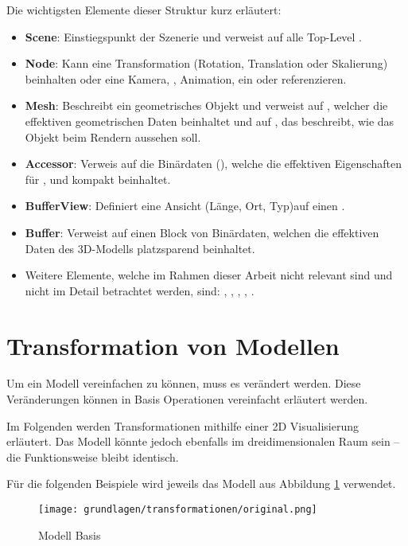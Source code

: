 Die wichtigsten Elemente dieser Struktur kurz erläutert:
\begin{itemize}
  \item \textbf{Scene}: Einstiegspunkt der Szenerie und verweist auf alle Top-Level .
  \item \textbf{Node}: Kann eine Transformation (Rotation, Translation oder Skalierung) beinhalten oder eine Kamera, , Animation, ein  oder  referenzieren.
  \item  \textbf{Mesh}: Beschreibt ein geometrisches Objekt und verweist auf , welcher die effektiven geometrischen Daten beinhaltet und auf , das beschreibt, wie das Objekt beim Rendern aussehen soll.
  \item \textbf{Accessor}: Verweis auf die Binärdaten (), welche die effektiven Eigenschaften für ,  und  kompakt beinhaltet.
  \item \textbf{BufferView}: Definiert eine Ansicht (Länge, Ort, Typ)auf einen .
  \item \textbf{Buffer}: Verweist auf einen Block von Binärdaten, welchen die effektiven Daten des 3D-Modells platzsparend beinhaltet.
  \item Weitere Elemente, welche im Rahmen dieser Arbeit nicht relevant sind und nicht im Detail betrachtet werden, sind: , , , , .
\end{itemize}

\section{Transformation von Modellen}

Um ein Modell vereinfachen zu können, muss es verändert werden.
Diese Veränderungen können in Basis Operationen vereinfacht erläutert werden.

Im Folgenden werden Transformationen mithilfe einer 2D Visualisierung erläutert. Das Modell könnte jedoch ebenfalls im dreidimensionalen Raum sein – die Funktionsweise bleibt identisch.

Für die folgenden Beispiele wird jeweils das Modell aus Abbildung \ref{fig:transformationOriginal} verwendet.

\begin{figure}[H]
  \centering
  \texttt{[image: grundlagen/transformationen/original.png]}
  \caption{Modell Basis}
  \label{fig:transformationOriginal}
\end{figure}

